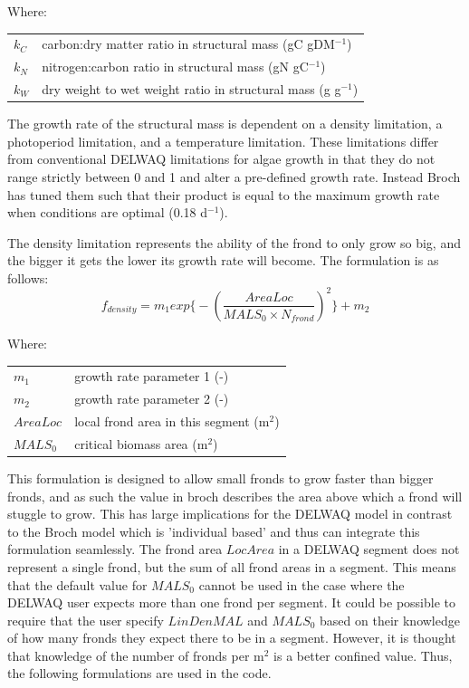 \documentclass{deltares_manual}
\begin{document}
Where:\\
\begin{tabular}{ll}
$k_C$        & carbon:dry matter ratio in structural mass (gC gDM$^{-1}$)\\
$k_N$        & nitrogen:carbon ratio in structural mass (gN gC$^{-1}$)\\
$k_W$        & dry weight to wet weight ratio in structural mass (g g$^{-1}$)\\
\end{tabular}
The growth rate of the structural mass is dependent on a density limitation, a photoperiod limitation, and a temperature limitation. These limitations differ from conventional DELWAQ limitations for algae growth in that they do not range strictly between 0 and 1 and alter a pre-defined growth rate. Instead Broch has tuned them such that their product is equal to the maximum growth rate when conditions are optimal (0.18 d$^{-1}$). 

The density limitation represents the ability of the frond to only grow so big, and the bigger it gets the lower its growth rate will become. The formulation is as follows:
\begin{equation}
f_{density} = m_1 exp\big\{-(\frac{AreaLoc}{MALS_0\times N_{frond}})^2 \big\}+m_2
\end{equation}

Where:\\

\begin{tabular}{ll}
	$m_1$    & growth rate parameter 1 (-)\\
	$m_2$    & growth rate parameter 2 (-)\\
	$AreaLoc$ & local frond area in this segment (m$^2$)\\
	$MALS_0$ & critical biomass area (m$^2$)\\
\end{tabular}

This formulation is designed to allow small fronds to grow faster than bigger fronds, and as such the value in broch describes the area above which a frond will stuggle to grow. This has large implications for the DELWAQ model in contrast to the Broch model which is 'individual based' and thus can integrate this formulation seamlessly. The frond area $LocArea$ in a DELWAQ segment does not represent a single frond, but the sum of all frond areas in a segment. This means that the default value for $MALS_{0}$ cannot be used in the case where the DELWAQ user expects more than one frond per segment. It could be possible to require that the user specify $LinDenMAL$ and $MALS_{0}$ based on their knowledge of how many fronds they expect there to be in a segment. However, it is thought that knowledge of the number of fronds per m$^{2}$ is a better confined value. Thus, the following formulations are used in the code.
 
\end{document}
